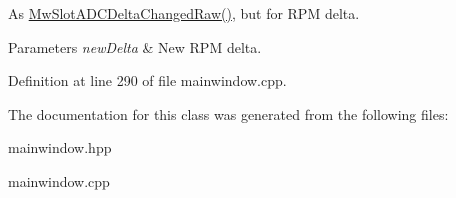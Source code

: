 As \hyperlink{class_main_window_acbdfd3592779f6946c4fecc33c79e9a4}{Mw\+Slot\+A\+D\+C\+Delta\+Changed\+Raw()}, but for R\+PM delta. 


\begin{DoxyParams}{Parameters}
{\em new\+Delta} & New R\+PM delta. \\
\hline
\end{DoxyParams}


Definition at line 290 of file mainwindow.\+cpp.



The documentation for this class was generated from the following files\+:\begin{DoxyCompactItemize}
\item 
mainwindow.\+hpp\item 
mainwindow.\+cpp\end{DoxyCompactItemize}
